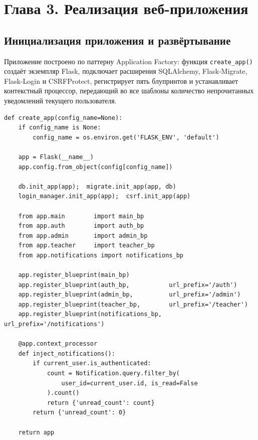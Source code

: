 \section*{Глава 3. Реализация веб-приложения}

\subsection{Инициализация приложения и развёртывание}

Приложение построено по паттерну Application Factory: функция
\texttt{create\_app()} создаёт экземпляр Flask, подключает расширения
SQLAlchemy, Flask-Migrate, Flask-Login и CSRFProtect, регистрирует пять
блупринтов и устанавливает контекстный процессор, передающий во все
шаблоны количество непрочитанных уведомлений текущего пользователя.

\begin{lstlisting}[caption={Функция Application Factory (app/\_\_init\_\_.py)}, label={lst:create_app}]
def create_app(config_name=None):
    if config_name is None:
        config_name = os.environ.get('FLASK_ENV', 'default')

    app = Flask(__name__)
    app.config.from_object(config[config_name])

    db.init_app(app);  migrate.init_app(app, db)
    login_manager.init_app(app);  csrf.init_app(app)

    from app.main        import main_bp
    from app.auth        import auth_bp
    from app.admin       import admin_bp
    from app.teacher     import teacher_bp
    from app.notifications import notifications_bp

    app.register_blueprint(main_bp)
    app.register_blueprint(auth_bp,           url_prefix='/auth')
    app.register_blueprint(admin_bp,          url_prefix='/admin')
    app.register_blueprint(teacher_bp,        url_prefix='/teacher')
    app.register_blueprint(notifications_bp,  url_prefix='/notifications')

    @app.context_processor
    def inject_notifications():
        if current_user.is_authenticated:
            count = Notification.query.filter_by(
                user_id=current_user.id, is_read=False
            ).count()
            return {'unread_count': count}
        return {'unread_count': 0}

    return app
\end{lstlisting}

